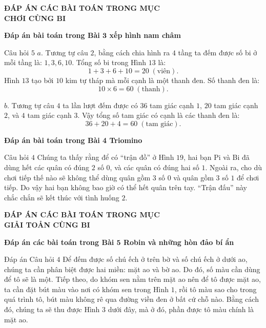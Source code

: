 \graphicspath{{../loigiai/pic/}}

\begin{center}
	\textbf{\color{toancuabi}ĐÁP ÁN CÁC BÀI TOÁN TRONG MỤC \\ CHƠI CÙNG BI}
\end{center}
\begin{center}
	\textbf{\color{toancuabi}Đáp án bài toán trong Bài $\pmb3$ xếp hình nam châm}
\end{center}
Câu hỏi $5$
\vskip 0.1cm
$a.$	Tương tự câu $2$, bằng cách chia hình ra $4$ tầng ta đếm được số bi ở mỗi tầng là: $1,3,6,10$. Tổng số bi trong Hình $13$ là:
$$1+3+6+10= 20 \;(\text{viên}).$$
Hình $13$ tạo bởi $10$ kim tự tháp mà mỗi cạnh là một thanh đen. Số thanh đen là: 
$$10\times 6=60 \;(\text{thanh}).$$

$b.$	Tương tự câu $4$ ta lần lượt đếm được có $36$ tam  giác cạnh $1$, $20$ tam giác cạnh $2$, và $4$ tam giác cạnh $3$. Vậy tổng số tam giác có cạnh là các thanh đen là:
$$36+20+4=60  \;(\text{tam giác}).$$
\begin{center}
	\textbf{\color{toancuabi}Đáp án bài toán trong Bài 4 Triomino}
\end{center}
Câu hỏi $4$
\vskip 0.1cm
Chúng ta thấy rằng để có “trận đồ” ở Hình $19$, hai bạn Pi và Bi đã dùng hết các quân có đúng $2$ số $0$, và các quân có đúng hai số $1$. Ngoài ra, cho dù chơi tiếp thế nào sẽ không thể dùng quân gồm $3$ số $0$ và quân gồm $3$ số $1$ để chơi tiếp. Do vậy hai bạn không bao giờ có thể hết quân trên tay. “Trận đấu” này chắc chắn sẽ kết thúc với tình huống $2$.
\newpage
\newpage
\begin{center}
	\textbf{\color{toancuabi}ĐÁP ÁN CÁC BÀI TOÁN TRONG MỤC\\GIẢI TOẢN CÙNG BI}
\end{center}
\begin{center}
	\textbf{\color{toancuabi}Đáp án các bài toán trong Bài $\pmb5$ Robin và những hòn đảo bí ẩn}
\end{center}
Đáp án Câu hỏi $4$
\vskip 0.1cm
Để đếm được số chú ếch ở trên bờ và số chú ếch ở dưới ao, chúng ta cần phân biệt được hai miền: mặt ao và bờ ao. Do đó, số màu cần dùng để tô sẽ là một. Tiếp theo, do khóm sen nằm trên mặt ao nên để tô được mặt ao, ta cần đặt bút màu vào nơi có khóm sen trong Hình $1$, rồi tô màu sao cho trong quá trình tô, bút màu không rê qua đường viền đen ở bất cứ chỗ nào. Bằng cách đó, chúng ta sẽ thu được Hình $3$ dưới đây, mà ở đó, phần được tô màu chính là mặt ao. 
